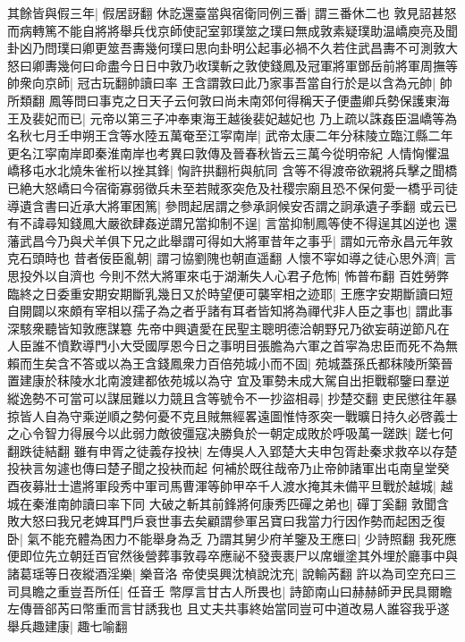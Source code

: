 其餘皆與假三年|{
	假居訝翻}
休訖還臺當與宿衛同例三番|{
	謂三番休二也}
敦見詔甚怒而病轉篤不能自將將舉兵伐京師使記室郭璞筮之璞曰無成敦素疑璞助温嶠庾亮及聞卦凶乃問璞曰卿更筮吾夀幾何璞曰思向卦明公起事必禍不久若住武昌夀不可測敦大怒曰卿夀幾何曰命盡今日日中敦乃收璞斬之敦使錢鳳及冠軍將軍鄧岳前將軍周撫等帥衆向京師|{
	冠古玩翻帥讀曰率}
王含謂敦曰此乃家事吾當自行於是以含為元帥|{
	帥所類翻}
鳳等問曰事克之日天子云何敦曰尚未南郊何得稱天子便盡卿兵勢保護東海王及裴妃而已|{
	元帝以第三子冲奉東海王越後裴妃越妃也}
乃上疏以誅姦臣温嶠等為名秋七月壬申朔王含等水陸五萬奄至江寜南岸|{
	武帝太康二年分秣陵立臨江縣二年更名江寜南岸即秦淮南岸也考異曰敦傳及晉春秋皆云三萬今從明帝紀}
人情恟懼温嶠移屯水北燒朱雀桁以挫其鋒|{
	恟許拱翻桁與航同}
含等不得渡帝欲親將兵擊之聞橋已絶大怒嶠曰今宿衛寡弱徵兵未至若賊豕突危及社稷宗廟且恐不保何愛一橋乎司徒導遺含書曰近承大將軍困篤|{
	參問起居謂之參承詗候安否謂之詗承遺子季翻}
或云已有不諱尋知錢鳳大嚴欲肆姦逆謂兄當抑制不逞|{
	言當抑制鳳等使不得逞其凶逆也}
還藩武昌今乃與犬羊俱下兄之此舉謂可得如大將軍昔年之事乎|{
	謂如元帝永昌元年敦克石頭時也}
昔者佞臣亂朝|{
	謂刁協劉隗也朝直遥翻}
人懷不寜如導之徒心思外濟|{
	言思投外以自濟也}
今則不然大將軍來屯于湖漸失人心君子危怖|{
	怖普布翻}
百姓勞弊臨終之日委重安期安期斷乳幾日又於時望便可襲宰相之迹耶|{
	王應字安期斷讀曰短}
自開闢以來頗有宰相以孺子為之者乎諸有耳者皆知將為禪代非人臣之事也|{
	謂此事深駭衆聽皆知敦應謀簒}
先帝中興遺愛在民聖主聰明德洽朝野兄乃欲妄萌逆節凡在人臣誰不憤歎導門小大受國厚恩今日之事明目張膽為六軍之首寜為忠臣而死不為無賴而生矣含不答或以為王含錢鳳衆力百倍苑城小而不固|{
	苑城蓋孫氏都秣陵所築晉置建康於秣陵水北南渡建都依苑城以為守}
宜及軍勢未成大駕自出拒戰郗鑒曰羣逆縱逸勢不可當可以謀屈難以力競且含等號令不一抄盜相尋|{
	抄楚交翻}
吏民懲往年暴掠皆人自為守乘逆順之勢何憂不克且賊無經畧遠圖惟恃豕突一戰曠日持久必啓義士之心令智力得展今以此弱力敵彼彊寇决勝負於一朝定成敗於呼吸萬一蹉跌|{
	蹉七何翻跌徒結翻}
雖有申胥之徒義存投袂|{
	左傳吳人入郢楚大夫申包胥赴秦求救卒以存楚投袂言匆遽也傳曰楚子聞之投袂而起}
何補於既往哉帝乃止帝帥諸軍出屯南皇堂癸酉夜募壯士遣將軍段秀中軍司馬曹渾等帥甲卒千人渡水掩其未備平旦戰於越城|{
	越城在秦淮南帥讀曰率下同}
大破之斬其前鋒將何康秀匹磾之弟也|{
	磾丁奚翻}
敦聞含敗大怒曰我兄老婢耳門戶衰世事去矣顧謂參軍呂寶曰我當力行因作勢而起困乏復卧|{
	氣不能充體為困力不能舉身為乏}
乃謂其舅少府羊鑒及王應曰|{
	少詩照翻}
我死應便即位先立朝廷百官然後營葬事敦尋卒應祕不發喪裹尸以席蠟塗其外埋於廳事中與諸葛瑶等日夜縱酒淫樂|{
	樂音洛}
帝使吳興沈楨說沈充|{
	說輸芮翻}
許以為司空充曰三司具瞻之重豈吾所任|{
	任音壬}
幣厚言甘古人所畏也|{
	詩節南山曰赫赫師尹民具爾瞻左傳晉郤芮曰幣重而言甘誘我也}
且丈夫共事終始當同豈可中道改易人誰容我乎遂舉兵趣建康|{
	趣七喻翻}
